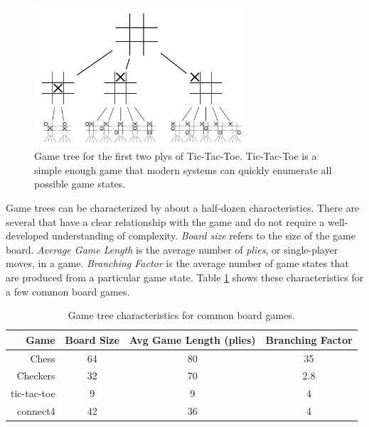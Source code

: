 \documentclass[11pt]{article}
\begin{document}
\begin{figure}[ht]
  \centering
    \includegraphics[width=0.7\textwidth]{pictures/gametree.png}
  \caption
  {
    Game tree\cite{gdr07} for the first two plys of Tic-Tac-Toe. Tic-Tac-Toe is
    a simple enough game that modern systems can quickly enumerate all
    possible game states.
    \label{fig:gametree}
  }
\end{figure}

Game trees can be characterized by about a half-dozen characteristics. There
are several that have a clear relationship with the game and do not require a
well-developed understanding of complexity. \textit{Board size} refers to the
size of the game board.
\textit{Average Game Length} is the average number of \textit{plies}, or
single-player moves, in a game. \textit{Branching Factor} is the average number
of game states that are produced from a particular game state. Table
\ref{tab:gametrees} shows these characteristics for a few common board games. 

\begin{table}[ht]
  \centering
  \begin{tabular}[ht]{ | r | c | c | c | }
    \hline
    Game & Board Size & Avg Game Length (plies) & Branching Factor\\ 
    \hline
    Chess    \cite{shannon50} & 64 & 80 &  35 \\
    Checkers \cite{allis94}   & 32 & 70 & 2.8 \\
    tic-tac-toe               &  9 &  9 &   4 \\
    connect4 \cite{allis94}   & 42 & 36 &   4 \\
    \hline
  \end{tabular}
  \caption
  {
    Game tree characteristics for common board games. 
    \label{tab:gametrees}
  }
  
\end{table}
\end{document}
